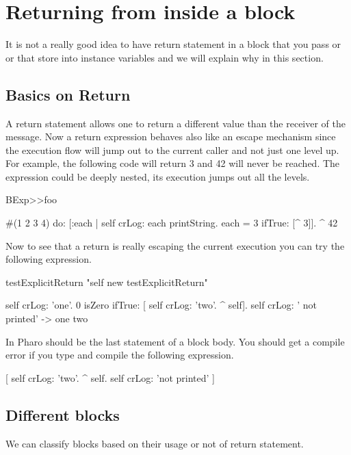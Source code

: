 \documentclass[a4paper,10pt,twoside]{book}
\begin{document}
\section{Returning from inside a block}
It is not a really good idea to have return statement in a block that you pass or or that store into instance variables and we will explain why in this section.

\subsection{Basics on Return}
A return statement allows one to return a different value than the receiver of the message.
Now a return expression behaves also like an escape mechanism since the execution flow will jump out to the current caller and not just one level up. For example, the following code will return 3 and 42 will never be reached. The expression \ct{[^3]} could be deeply nested, its execution jumps out all the levels.

\begin{code}{}
BExp>>foo
	
	#(1 2 3 4) do: [:each | self crLog: each printString. 
						each = 3 
							ifTrue: [^ 3]].						
	^ 42
\end{code}

Now to see that a return is really escaping the current execution you can try the following expression. 

\begin{code}{}
testExplicitReturn
	"self new testExplicitReturn"
	
	self crLog: 'one'.
	0 isZero ifTrue: [ self crLog: 'two'. ^ self].
	self crLog: ' not printed'
-> one two
\end{code}



In Pharo \ct{^} should be the last statement of a block body. You should get a compile error if you type and compile the following expression. 

\begin{code}{}
[ self crLog: 'two'.
  ^ self.  
  self crLog: 'not printed' ]
\end{code}



\subsection{Different blocks} 

We can classify blocks based on their usage or not of return statement. 
\end{document}
